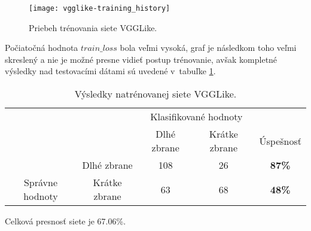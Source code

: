 \begin{figure}[H]
	\centering
	\texttt{[image: vgglike-training\_history]}
	\caption{Priebeh trénovania siete VGGLike.}
	\label{pic:vgglikehistory}
\end{figure}

Počiatočná hodnota $train\_loss$ bola veľmi vysoká, graf je následkom toho veľmi skreslený a nie je možné presne vidieť postup trénovanie,
    avšak kompletné výsledky nad testovacími dátami sú uvedené v~tabuľke \ref{tab:vgglikeresults}.

\begin{table}[H]
    \centering
    \begin{tabular}{ccccc}
                                                                &                                    & \multicolumn{2}{c}{Klasifikované hodnoty}                                                         &                                    \\ \cline{3-5} 
                                                                & \multicolumn{1}{c|}{}              & \multicolumn{1}{c|}{Dlhé zbrane}                & \multicolumn{1}{c|}{Krátke zbrane}              & \multicolumn{1}{c|}{Úspešnosť}     \\ \cline{2-5} 
        \multicolumn{1}{c|}{}                                  & \multicolumn{1}{c|}{Dlhé zbrane}   & \multicolumn{1}{c|}{{\color[HTML]{009901} 108}} & \multicolumn{1}{c|}{{\color[HTML]{9A0000} 26}}  & \multicolumn{1}{c|}{\textbf{87\%}} \\ \cline{2-5} 
        \multicolumn{1}{c|}{\multirow{-2}{*}{Správne hodnoty}} & \multicolumn{1}{c|}{Krátke zbrane} & \multicolumn{1}{c|}{{\color[HTML]{9A0000} 63}}  & \multicolumn{1}{c|}{{\color[HTML]{009901} 68}} & \multicolumn{1}{c|}{\textbf{48\%}} \\ \cline{2-5} 
    \end{tabular}
    \caption{Výsledky natrénovanej siete VGGLike.}
    \label{tab:vgglikeresults}
\end{table}
Celková presnosť siete je 67.06\%.
